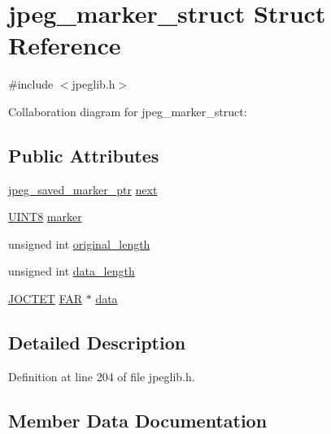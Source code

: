 \hypertarget{structjpeg__marker__struct}{}\section{jpeg\+\_\+marker\+\_\+struct Struct Reference}
\label{structjpeg__marker__struct}


{\ttfamily \#include $<$jpeglib.\+h$>$}



Collaboration diagram for jpeg\+\_\+marker\+\_\+struct\+:
\subsection*{Public Attributes}
\begin{DoxyCompactItemize}
\item 
\mbox{\hyperlink{jpeglib_8h_a2efb5205b3e81589f2dc133f1a412bb0}{jpeg\+\_\+saved\+\_\+marker\+\_\+ptr}} \mbox{\hyperlink{structjpeg__marker__struct_a1cb619806ea91b42a46b2a04fafabd82}{next}}
\item 
\mbox{\hyperlink{jmorecfg_8h_adfb9a8ea1dd59f151065f763e1e9acd6}{U\+I\+N\+T8}} \mbox{\hyperlink{structjpeg__marker__struct_a154cf70fc9b4f86da631ca08a12a8d33}{marker}}
\item 
unsigned int \mbox{\hyperlink{structjpeg__marker__struct_a3b17d58a17fa6be8560b697da814dfd3}{original\+\_\+length}}
\item 
unsigned int \mbox{\hyperlink{structjpeg__marker__struct_a98412e9bccde6954ce55f611ad146a6b}{data\+\_\+length}}
\item 
\mbox{\hyperlink{jmorecfg_8h_a356ad249f20e691b520da439f92cccbc}{J\+O\+C\+T\+ET}} \mbox{\hyperlink{jmorecfg_8h_aef060b3456fdcc093a7210a762d5f2ed}{F\+AR}} $\ast$ \mbox{\hyperlink{structjpeg__marker__struct_ac8d0d5b3294a6ac3629640d4164a1ea6}{data}}
\end{DoxyCompactItemize}


\subsection{Detailed Description}


Definition at line 204 of file jpeglib.\+h.



\subsection{Member Data Documentation}
\mbox{\label{structjpeg__marker__struct_ac8d0d5b3294a6ac3629640d4164a1ea6}} 
